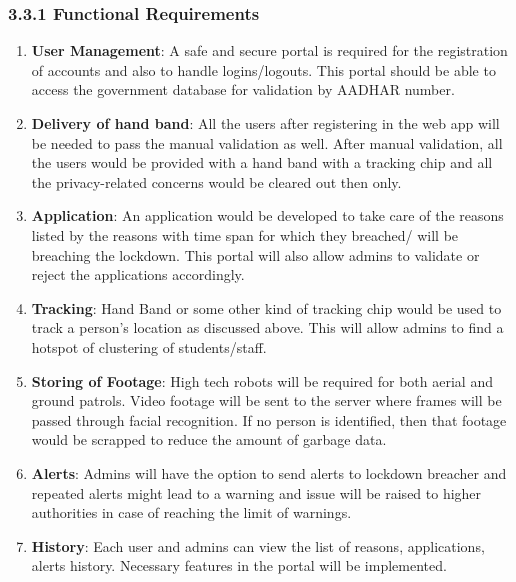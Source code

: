 \documentclass[eng]{FCEFyN-class}
\begin{document}
\subsubsection{3.3.1 Functional Requirements}
\begin{enumerate}
    \item \textbf{User Management}: A safe and secure portal is required for the registration of accounts and also to handle logins/logouts. This portal should be able to access the government database for validation by AADHAR number.
    
    \item \textbf{Delivery of hand band}: All the users after registering in the web app will be needed to pass the manual validation as well. After manual validation, all the users would be provided with a hand band with a tracking chip and all the privacy-related concerns would be cleared out then only.\\
    \item \textbf{Application}: An application would be developed to take care of the reasons listed by the reasons with time span for which they breached/ will be breaching the lockdown. This portal will also allow admins to validate or reject the applications accordingly.
    
    \item \textbf{Tracking}: Hand Band or some other kind of tracking chip would be used to track a person's location as discussed above. This will allow admins to find a hotspot of clustering of students/staff.
    
    \item \textbf{Storing of Footage}: High tech robots will be required for both aerial and ground patrols. Video footage will be sent to the server where frames will be passed through facial recognition. If no person is identified, then that footage would be scrapped to reduce the amount of garbage data. 
    
    \item \textbf{Alerts}: Admins will have the option to send alerts to lockdown breacher and repeated alerts might lead to a warning and issue will be raised to higher authorities in case of reaching the limit of warnings.
    \item \textbf{History}: Each user and admins can view the list of reasons, applications, alerts history. Necessary features in the portal will be implemented.
\end{enumerate}
\end{document}
